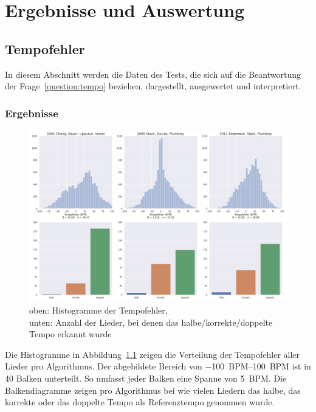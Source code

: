 \chapter{Ergebnisse und Auswertung}
\label{ergebnisse}
\acresetall

\section{Tempofehler}
{
	In diesem Abschnitt werden die Daten des Tests,
		die sich auf die Beantwortung der Frage~\ref{question:tempo} beziehen,
		dargestellt, ausgewertet und interpretiert.

	\subsection{Ergebnisse}
	{
		\begin{figure}[h]
			\hspace{-17mm}
			\includegraphics[scale=0.4]{resources/tempo_error_histogram.png}
			\caption{
				oben: Histogramme der Tempofehler, \\
				unten: Anzahl der Lieder, bei denen das halbe/korrekte/doppelte Tempo erkannt wurde
			}
			\label{fig:tempoerror}
		\end{figure}

		Die Histogramme in Abbildung~\ref{fig:tempoerror} zeigen die Verteilung der Tempofehler aller Lieder pro Algorithmus.
		Der abgebildete Bereich von \SIrange{-100}{100}{\ac{BPM}} ist in \num{40} Balken unterteilt.
		So umfasst jeder Balken eine Spanne von \SI{5}{\ac{BPM}}.
		Die Balkendiagramme zeigen pro Algorithmus
			bei wie vielen Liedern das halbe, das korrekte oder das doppelte Tempo als Referenztempo genommen wurde.

}}
